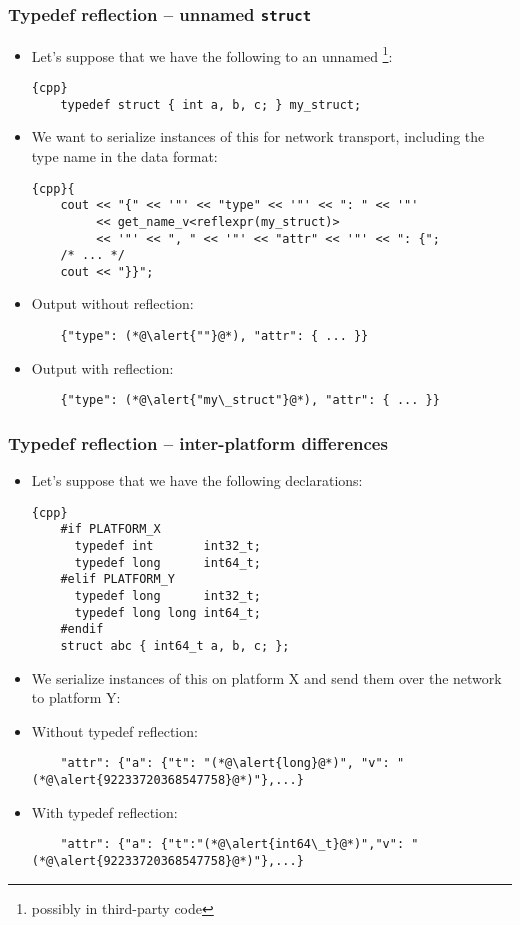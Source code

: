 \documentclass[compress,table,xcolor=table]{beamer}
\begin{document}
\begin{frame}[fragile]
\frametitle{Typedef reflection -- unnamed \texttt{struct}}
  \footnotesize
  \begin{itemize}
    \item Let's suppose that we have the following \verb@typedef@ to an unnamed
      \verb@struct@\footnote{possibly in third-party code}:
    \begin{lstlisting}{cpp}
	typedef struct { int a, b, c; } my_struct;
    \end{lstlisting}
    \item We want to serialize instances of this \verb@struct@ for network transport,
      including the type name in the data format:
      \begin{lstlisting}{cpp}{
	cout << "{" << '"' << "type" << '"' << ": " << '"'
	     << get_name_v<reflexpr(my_struct)>
	     << '"' << ", " << '"' << "attr" << '"' << ": {";
	/* ... */
	cout << "}}";
      \end{lstlisting}
    \item Output without \verb@typedef@ reflection:
    \begin{lstlisting}
	{"type": (*@\alert{""}@*), "attr": { ... }}
    \end{lstlisting}
    \item Output with \verb@typedef@ reflection:
    \begin{lstlisting}
	{"type": (*@\alert{"my\_struct"}@*), "attr": { ... }}
    \end{lstlisting}
  \end{itemize}
\end{frame}

\begin{frame}[fragile]
\frametitle{Typedef reflection -- inter-platform differences}
  \footnotesize
  \begin{itemize}
    \item Let's suppose that we have the following declarations:
    \begin{lstlisting}{cpp}
	#if PLATFORM_X
	  typedef int       int32_t;
	  typedef long      int64_t;
	#elif PLATFORM_Y
	  typedef long      int32_t;
	  typedef long long int64_t;
	#endif
	struct abc { int64_t a, b, c; };
    \end{lstlisting}
    \item We serialize instances of this \verb@struct@ on platform X and
      send them over the network to platform Y:
    \item Without typedef reflection:
    \begin{lstlisting}
	"attr": {"a": {"t": "(*@\alert{long}@*)", "v": "(*@\alert{92233720368547758}@*)"},...}
    \end{lstlisting}
    \item With typedef reflection:
    \begin{lstlisting}
	"attr": {"a": {"t":"(*@\alert{int64\_t}@*)","v": "(*@\alert{92233720368547758}@*)"},...}
    \end{lstlisting}
  \end{itemize}
\end{frame}
\end{document}
